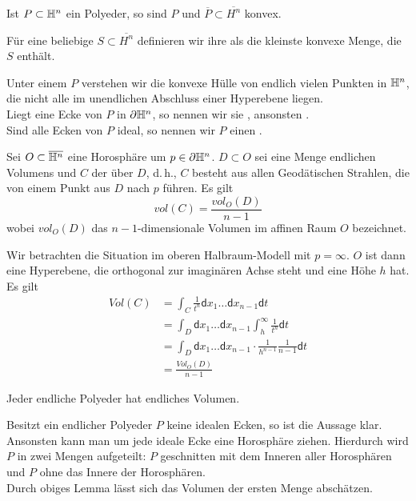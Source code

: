 \documentclass{book}
\renewcommand{\d}{\textsf{d}}
\begin{document}
\Bem{}
Ist $P \subset \mathbb{H}^n$ ein Polyeder, so sind $P$ und $\overline{P}\subset \overline{H^n}$ konvex.

\Def{}
Für eine beliebige $S \subset \overline{H^n}$ definieren wir ihre  als die kleinste konvexe Menge, die $S$ enthält.

\Def{}
Unter einem  $P$ verstehen wir die konvexe Hülle von endlich vielen Punkten in $\mathbb{H}^n$, die nicht alle im unendlichen Abschluss einer Hyperebene liegen.\\
Liegt eine Ecke von $P$ in $\partial \mathbb{H}^n$, so nennen wir sie , ansonsten .\\
Sind alle Ecken von $P$ ideal, so nennen wir $P$ einen .

\Lem{}
Sei $O \subset \overline{\mathbb{H}^n}$ eine Horosphäre um $p \in \partial \mathbb{H}^n$. $D \subset O$ sei eine Menge endlichen Volumens und $C$ der  über $D$, d.\,h., $C$ besteht aus allen Geodätischen Strahlen, die von einem Punkt aus $D$ nach $p$ führen. Es gilt
\[ vol(C) = \frac{vol_O(D)}{n-1} \]
wobei $vol_O(D)$ das $n-1$-dimensionale Volumen im affinen Raum $O$ bezeichnet.
\begin{Beweis}{}
	Wir betrachten die Situation im oberen Halbraum-Modell mit $p = \infty$. $O$ ist dann eine Hyperebene, die orthogonal zur imaginären Achse steht und eine Höhe $h$ hat. Es gilt
	\begin{align*}
	Vol(C) &= \int_{C} \frac{1}{t^n} \d x_1 \ldots \d x_{n-1} \d t\\
	&= \int_{D}\d x_1 \ldots \d x_{n-1} \int_{h}^{\infty} \frac{1}{t^n} \d t\\
		&= \int_{D}\d x_1 \ldots \d x_{n-1} \cdot \frac{1}{h^{n-1}} \frac{1}{n-1} \d t\\
	&= \frac{Vol_O(D)}{n-1}
	\end{align*}
\end{Beweis}

\Prop{}
Jeder endliche Polyeder hat endliches Volumen.
\begin{Beweis}{}
	Besitzt ein endlicher Polyeder $P$ keine idealen Ecken, so ist die Aussage klar. Ansonsten kann man um jede ideale Ecke eine Horosphäre ziehen. Hierdurch wird $P$ in zwei Mengen aufgeteilt: $P$ geschnitten mit dem Inneren aller Horosphären und $P$ ohne das Innere der Horosphären.\\
	Durch obiges Lemma lässt sich das Volumen der ersten Menge abschätzen.
\end{Beweis}
\end{document}
